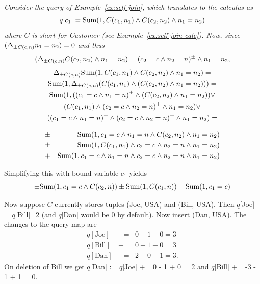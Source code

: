 \begin{example}\em
\label{ex:self-join-delta}
Consider the query of Example~\ref{ex:self-join}, which translates to the
calculus as
\[
q[c_1] = \mbox{Sum}(1, C(c_1,n_1) \land C(c_2, n_2) \land n_1=n_2)
\]
where $C$ is short for Customer (see Example~\ref{ex:self-join-calc}).
Now, since $(\Delta_{\pm C(c,n)} n_1=n_2) = 0$ and thus
\[
(\Delta_{\pm C(c,n)} C(c_2, n_2) \land n_1=n_2) = (c_2=c \land n_2=n)^\pm \land n_1=n_2,
\]
\begin{multline*}
\Delta_{\pm C(c,n)} \mbox{Sum}(1, C(c_1,n_1) \land C(c_2, n_2) \land n_1=n_2) = \\
\mbox{Sum}(1, \Delta_{\pm C(c,n)} (C(c_1,n_1) \land (C(c_2, n_2) \land n_1=n_2))) = \\
\mbox{Sum}(1, 
((c_1=c \land n_1=n)^\pm \land (C(c_2, n_2) \land n_1=n_2)) \lor \\
(C(c_1,n_1) \land (c_2=c \land n_2=n)^\pm \land n_1=n_2) \lor \\
((c_1=c \land n_1=n)^\pm \land (c_2=c \land n_2=n)^\pm \land n_1=n_2) =
\end{multline*}

\vspace{-6mm}

\begin{eqnarray*}
&\pm& \mbox{Sum}(1, c_1=c \land n_1=n \land C(c_2, n_2)       \land n_1=n_2) \\
&\pm& \mbox{Sum}(1, C(c_1,n_1)        \land c_2=c \land n_2=n \land n_1=n_2) \\
&+&   \mbox{Sum}(1, c_1=c \land n_1=n \land c_2=c \land n_2=n \land n_1=n_2)
\end{eqnarray*}

Simplifying this with bound variable $c_1$ yields
\[
\pm \mbox{Sum}(1, c_1=c \land C(c_2, n))
\pm \mbox{Sum}(1, C(c_1,n))
+   \mbox{Sum}(1, c_1=c)
\]

Now suppose $C$ currently stores tuples (Joe, USA) and (Bill, USA).
Then $q$[Joe] = $q$[Bill]=2 (and $q$[Dan] would be 0 by default).
Now insert (Dan, USA).
The changes to the query map are
\begin{eqnarray*}
q[\mbox{Joe}]  &\mbox{+=}& 0 + 1 + 0 = 3 \\
q[\mbox{Bill}] &\mbox{+=}& 0 + 1 + 0 = 3 \\
q[\mbox{Dan}]  &\mbox{+=}& 2 + 0 + 1 = 3.
\end{eqnarray*}
On deletion of Bill we get
$q$[Dan] := $q$[Joe] += 0 - 1 + 0 = 2 and
$q$[Bill] += -3 - 1 + 1 = 0.


\end{example}
